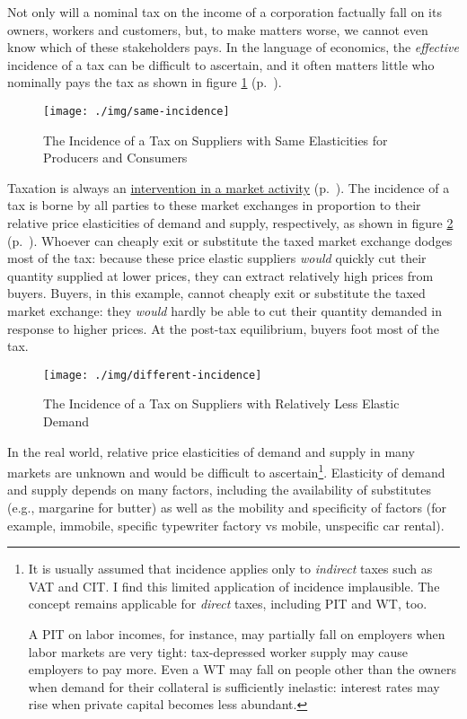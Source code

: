 Not only will a nominal tax on the income of a corporation factually fall on its owners, workers and customers, but, to make matters worse, we cannot even know which of these stakeholders pays. In the language of economics, the \emph{effective} incidence of a tax can be difficult to ascertain, and it often matters little who nominally pays the tax as shown in figure \ref{fig:same-incidence} (p.~\pageref{fig:same-incidence}).

 \begin{figure}[htbp]
	\centering
	\texttt{[image: ./img/same-incidence]}
	\caption[Incidence of a Tax on Suppliers with Unit-Elastic Supply and Demand]{The Incidence of a Tax on Suppliers with Same Elasticities for Producers and Consumers}
	\label{fig:same-incidence}
\end{figure}

Taxation is always an \hyperref[sec:marketvscommand]{intervention in a market activity} (p.~\pageref{sec:marketvscommand}). The incidence of a tax is borne by all parties to these market exchanges in proportion to their relative price elasticities of demand and supply, respectively, as shown in figure \ref{fig:different-incidence} (p.~\pageref{fig:different-incidence}). Whoever can cheaply exit or substitute the taxed market exchange dodges most of the tax: because these price elastic suppliers \emph{would} quickly cut their quantity supplied at lower prices, they can extract relatively high prices from buyers. Buyers, in this example, cannot cheaply exit or substitute the taxed market exchange: they \emph{would} hardly be able to cut their quantity demanded in response to higher prices. At the post-tax equilibrium, buyers foot most of the tax.

 \begin{figure}[htbp]
	\centering
	\texttt{[image: ./img/different-incidence]}
	\caption[Incidence of a Tax on Suppliers with Relatively Inelastic Demand]{The Incidence of a Tax on Suppliers with Relatively Less Elastic Demand}
	\label{fig:different-incidence}
\end{figure}

In the real world, relative price elasticities of demand and supply in many markets are unknown and would be difficult to ascertain\footnote{
	It is usually assumed that incidence applies only to \emph{indirect} taxes such as \gls{VAT} and \gls{CIT}. I find this limited application of incidence implausible. The concept remains applicable for \emph{direct} taxes, including \gls{PIT} and \gls{WT}, too.

	A \gls{PIT} on labor incomes, for instance, may partially fall on employers when labor markets are very tight: tax-depressed worker supply may cause employers to pay more. Even a \gls{WT} may fall on people other than the owners when demand for their collateral is sufficiently inelastic: interest rates may rise when private capital becomes less abundant.}.
Elasticity of demand and supply depends on many factors, including the availability of substitutes (e.g., margarine for butter) as well as the mobility and specificity of factors (for example, immobile, specific typewriter factory vs mobile, unspecific car rental).

